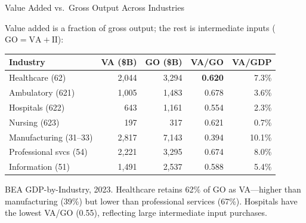 \begin{frame}{Value Added vs.\ Gross Output Across Industries}

{\small Value added is a fraction of gross output; the rest is intermediate inputs ($\text{GO} = \text{VA} + \text{II}$):}

\vspace{-6pt}
\begin{table}
\centering
\footnotesize
\setlength{\tabcolsep}{4pt}
\renewcommand{\arraystretch}{0.9}
\begin{tabular}{lrrrr}
\toprule
Industry & VA (\$B) & GO (\$B) & VA/GO & VA/GDP \\
\midrule
Healthcare (62) & 2,044 & 3,294 & \textbf{0.620} & 7.3\% \\
\quad Ambulatory (621) & 1,005 & 1,483 & 0.678 & 3.6\% \\
\quad Hospitals (622) & 643 & 1,161 & 0.554 & 2.3\% \\
\quad Nursing (623) & 197 & 317 & 0.621 & 0.7\% \\
\midrule
Manufacturing (31--33) & 2,817 & 7,143 & 0.394 & 10.1\% \\
Professional svcs (54) & 2,221 & 3,295 & 0.674 & 8.0\% \\
Information (51) & 1,491 & 2,537 & 0.588 & 5.4\% \\
\bottomrule
\end{tabular}
\end{table}

\vspace{-8pt}
{\footnotesize BEA GDP-by-Industry, 2023. Healthcare retains 62\% of GO as VA---higher than manufacturing (39\%) but lower than professional services (67\%). Hospitals have the lowest VA/GO (0.55), reflecting large intermediate input purchases.}

\end{frame}

